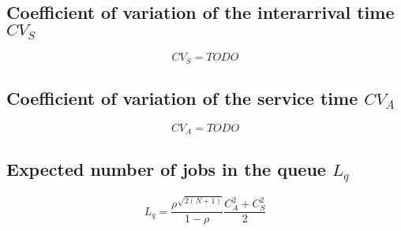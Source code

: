 \documentclass[11pt]{article}
\begin{document}
\subsection{Coefficient of variation of the interarrival time $CV_S$}

\begin{equation}
    CV_S = TODO
\end{equation}

\subsection{Coefficient of variation of the service time $CV_A$}

\begin{equation}
    CV_A = TODO
\end{equation}

\subsection{Expected number of jobs in the queue $L_q$}

\begin{equation}
    L_q = \frac{\rho^{\sqrt{2(N + 1)}}}{1 - \rho} \frac{C_A^2 + C_S^2}{2}
\end{equation}
\end{document}
